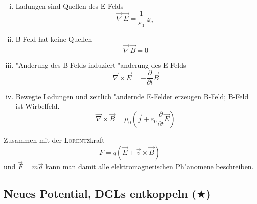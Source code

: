 \begin{Wichtig}
   ~\\
   \begin{enumerate}[(i)]
   \item Ladungen sind Quellen des E-Felds
      \begin{equation}
         \label{eqn_max1-diff}
         \vec \nabla \, \vec E = \frac{1}{\varepsilon_0} \varrho_q
      \end{equation}

   \item B-Feld hat keine Quellen
      \begin{equation}
         \label{eqn_max2-diff}
         \vec \nabla \, \vec B = 0
      \end{equation}


   \item "Anderung des B-Felds induziert "anderung des E-Felds
      \begin{equation}
         \label{eqn_max3-diff}
         \vec \nabla \times \vec E = - \frac{\partial }{\partial t}
         \vec B
      \end{equation}

   \item Bewegte Ladungen und zeitlich "andernde E-Felder erzeugen
      B-Feld; B-Feld ist Wirbelfeld.
      \begin{equation}
         \label{eqn_max4-diff}
         \vec \nabla \times \vec B = \mu_0 \left ( \vec j +
            \varepsilon_0 \frac{\partial }{\partial t} \vec E \right)
      \end{equation}

   \end{enumerate}
\end{Wichtig}


\begin{Wichtig}
Zusammen mit der \textsc{Lorentz}kraft
\begin{equation*}
   F = q (\vec E + \vec v \times \vec B)
\end{equation*}
und $\vec F = m\vec a$ kann man damit alle elektromagnetischen
Ph"anomene beschreiben.
\end{Wichtig}




\subsection{Neues Potential, DGLs entkoppeln ($\bigstar$)}
\label{kap_neues-potential}


